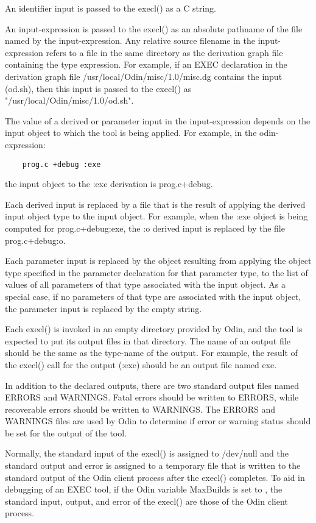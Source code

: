 An identifier input is passed to the {\ex execl()} as a {\ex C} string.

An input-expression is passed to the {\ex execl()} as an absolute pathname
of the file named by the input-expression.
Any relative source filename in the input-expression refers to a file
in the same directory as the derivation graph file containing the type
expression.  For example, if an {\ex EXEC} declaration in the
derivation graph file {\ex /usr/local/Odin/misc/1.0/misc.dg} contains
the input {\ex (od.sh)},
then this input is passed to the {\ex execl()} as
{\ex "/usr/local/Odin/misc/1.0/od.sh"}.

The value of a derived or parameter input in the input-expression
depends on the input object to which the tool is being applied.
For example, in the odin-expression:
\begin{verbatim}
    prog.c +debug :exe
\end{verbatim}
the input object to the {\ex :exe} derivation is {\ex prog.c+debug}.

Each derived input is replaced by a file that is
the result of applying the derived input object type to the input object.
For example, when the {\ex :exe} object is
being computed for {\ex prog.c+debug:exe},
the {\ex :o} derived input is replaced by the file
{\ex prog.c+debug:o}.

Each parameter input is replaced by
the object resulting from applying the object type
specified in the parameter declaration for that parameter type,
to the list of values of all parameters
of that type associated with the input object.
As a special case,
if no parameters of that type are associated with the input object,
the parameter input is replaced by the empty string.

Each {\ex execl()} is invoked in an empty directory provided by Odin,
and the tool is expected to put its output files in that directory.
The name of an output file should be the same as the type-name of
the output.  For example, the result of the {\ex execl()} call
for the output {\ex (:exe)} should be an output file named {\ex exe}.

In addition to the declared outputs,
there are two standard output files named {\ex ERRORS} and {\ex WARNINGS}.
Fatal errors should be written to {\ex ERRORS},
while recoverable errors should be written to {\ex WARNINGS}.
The {\ex ERRORS} and {\ex WARNINGS} files
are used by Odin to determine if error or warning status
should be set for the output of the tool.

Normally, the standard input of the {\ex execl()} is assigned to
{\ex /dev/null} and the standard output and error is assigned to
a temporary file that is written to the standard output of the
Odin client process after the {\ex execl()} completes.
To aid in debugging of an {\ex EXEC} tool,
if the Odin variable {\ex MaxBuilds} is set to {},
the standard input, output, and error of the {\ex execl()}
are those of the Odin client process.

